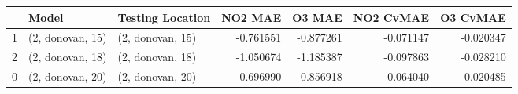 \begin{tabular}{lllrrrr}
\toprule
{} &             Model &  Testing Location &   NO2 MAE &    O3 MAE &  NO2 CvMAE &  O3 CvMAE \\
\midrule
1 &  (2, donovan, 15) &  (2, donovan, 15) & -0.761551 & -0.877261 &  -0.071147 & -0.020347 \\
2 &  (2, donovan, 18) &  (2, donovan, 18) & -1.050674 & -1.185387 &  -0.097863 & -0.028210 \\
0 &  (2, donovan, 20) &  (2, donovan, 20) & -0.696990 & -0.856918 &  -0.064040 & -0.020485 \\
\bottomrule
\end{tabular}
